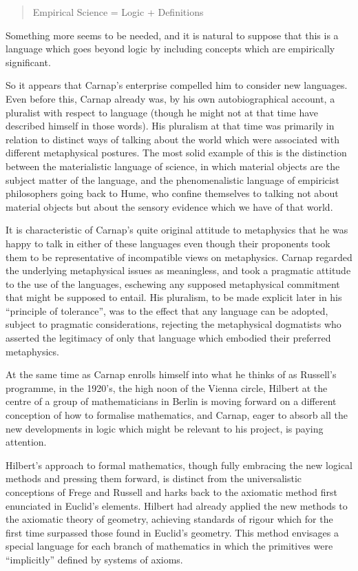 \begin{quote}
Empirical Science = Logic + Definitions
\end{quote}

Something more seems to be needed, and it is natural to suppose that
this is a language which goes beyond logic by including concepts which
are empirically significant.

So it appears that Carnap's enterprise compelled him to consider
new languages.
Even before this, Carnap already was, by his own autobiographical
account, a pluralist with respect to language (though he might not at
that time have described himself in those words).
His pluralism at that time was primarily in relation to distinct ways
of talking about the world which were associated with different
metaphysical postures.
The most solid example of this is the distinction between the
materialistic language of science, in which material objects are the
subject matter of the language, and the phenomenalistic language of
empiricist philosophers going back to Hume, who confine themselves to
talking not about material objects but about the sensory evidence
which we have of that world.

It is characteristic of Carnap's quite original attitude to
metaphysics that he was happy to talk in either of these languages
even though their proponents took them to be representative of
incompatible views on metaphysics.
Carnap regarded the underlying metaphysical issues as meaningless, and
took a pragmatic attitude to the use of the languages, eschewing any
supposed metaphysical commitment that might be supposed to entail.
His pluralism, to be made explicit later in his ``principle of
tolerance'', was to the effect that any language can be adopted,
subject to pragmatic considerations, rejecting the metaphysical
dogmatists who asserted the legitimacy of only that language which
embodied their preferred metaphysics.

At the same time as Carnap enrolls himself into what he thinks of as
Russell's programme, in the 1920's, the high noon of the Vienna
circle, Hilbert at the centre of a group of mathematicians in Berlin
is moving forward on a different conception of how to formalise
mathematics, and Carnap, eager to absorb all the new developments in
logic which might be relevant to his project, is paying attention.

Hilbert's approach to formal mathematics, though fully embracing the
new logical methods and pressing them forward, is distinct from the
universalistic conceptions of Frege and Russell and harks back to the
axiomatic method first enunciated in Euclid's elements.
Hilbert had already applied the new methods to the axiomatic theory of
geometry, achieving standards of rigour which for the first time
surpassed those found in Euclid's geometry.
This method envisages a special language for each branch of
mathematics in which the primitives were ``implicitly'' defined by
systems of axioms.

